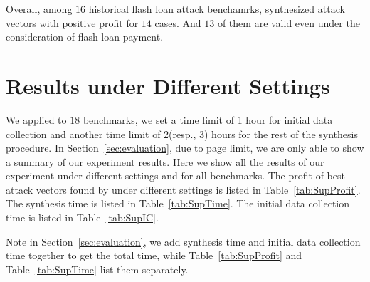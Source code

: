 Overall, among $16$ historical flash loan attack benchamrks, 
{\name} synthesized attack vectors with positive profit for 
$14$ cases. And $13$ of them are valid even under the 
consideration of flash loan payment. 






\section{{\name} Results under Different Settings}
We applied {\name} to $18$ benchmarks, we set a time limit of 1 hour for initial data
collection and another time limit of 2(resp., 3) hours for the rest of the synthesis procedure. 
In Section~\ref{sec:evaluation}, due to page limit, we are
only able to show a summary of our experiment results. 
Here we show all the results of our experiment 
under different settings and for all benchmarks.
The profit of best attack vectors found by {\name} under different settings is listed in 
Table~\ref{tab:SupProfit}. The synthesis time is listed in Table~\ref{tab:SupTime}.
The initial data collection time is listed in Table~\ref{tab:SupIC}. 

Note in Section~\ref{sec:evaluation}, we add synthesis time and initial data collection time
together to get the total time, while Table~\ref{tab:SupProfit} and Table~\ref{tab:SupTime}
list them separately.









